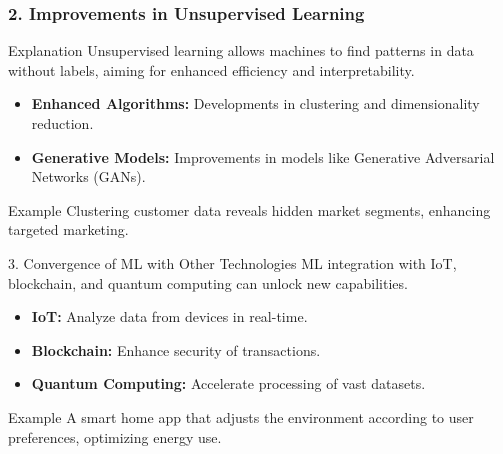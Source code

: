 \documentclass{beamer}
\begin{document}
\begin{frame}[fragile]
    \frametitle{2. Improvements in Unsupervised Learning}
    \begin{block}{Explanation}
        Unsupervised learning allows machines to find patterns in data without labels, aiming for enhanced efficiency and interpretability.
    \end{block}
    \begin{itemize}
        \item \textbf{Enhanced Algorithms:} Developments in clustering and dimensionality reduction.
        \item \textbf{Generative Models:} Improvements in models like Generative Adversarial Networks (GANs).
    \end{itemize}
    \begin{block}{Example}
        Clustering customer data reveals hidden market segments, enhancing targeted marketing.
    \end{block}
    
    \begin{block}{3. Convergence of ML with Other Technologies}
        ML integration with IoT, blockchain, and quantum computing can unlock new capabilities.
    \end{block}
    \begin{itemize}
        \item \textbf{IoT:} Analyze data from devices in real-time.
        \item \textbf{Blockchain:} Enhance security of transactions.
        \item \textbf{Quantum Computing:} Accelerate processing of vast datasets.
    \end{itemize}
    \begin{block}{Example}
        A smart home app that adjusts the environment according to user preferences, optimizing energy use.
    \end{block}
\end{frame}
\end{document}

